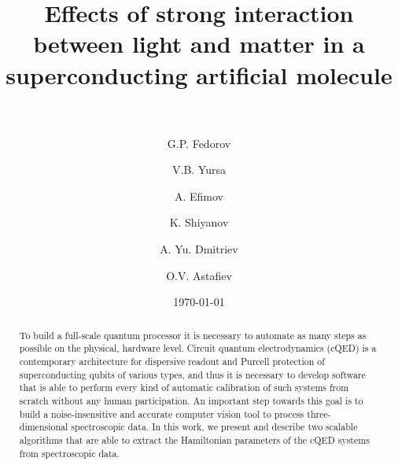 \documentclass[%
 aip,
 amsmath,amssymb,
 reprint,%
]{revtex4-1}
\newcommand{\mytitile}{Effects of strong interaction between light and matter in a superconducting artificial molecule}
\begin{document}
	
	\title[\mytitile]{\mytitile\\~}
	
	\author{G.P. Fedorov}
	
	
	\author{V.B. Yursa}
	
	\author{A. Efimov}
	

	\author{K. Shiyanov}


	\author{A. Yu. Dmitriev}

	\author{O.V. Astafiev}
	
	
	\date{\today}%
	
	
	\begin{abstract}
		To build a full-scale quantum processor it is necessary to automate as many steps as possible on the physical, hardware level. Circuit quantum electrodynamics (cQED) is a contemporary architecture for dispersive readout and Purcell protection of superconducting qubits of various types, and thus it is necessary to develop software that is able to perform every kind of automatic calibration of such systems from scratch without any human participation. An important step towards this goal is to build a noise-insensitive and accurate computer vision tool to process three-dimensional spectroscopic data. In this work, we present and describe two scalable algorithms that are able to extract the Hamiltonian parameters of the cQED systems from spectroscopic data. 
	\end{abstract}
	
	\maketitle
\end{document}
